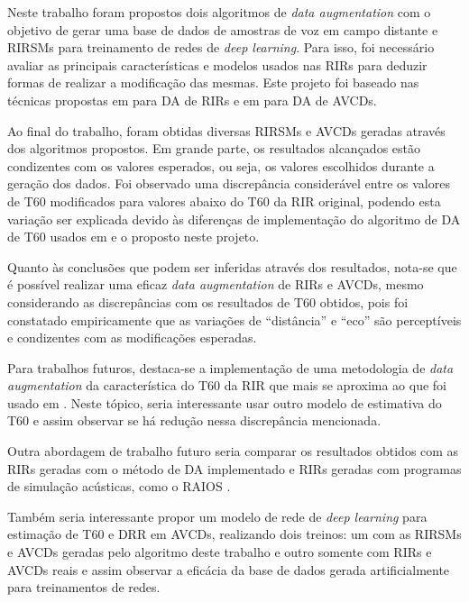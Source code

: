 Neste trabalho foram propostos dois algoritmos de \textit{data augmentation} com o objetivo de gerar uma base de dados de amostras de voz 
em campo distante e RIRSMs para treinamento de redes de \textit{deep learning}.
Para isso, foi necessário avaliar as principais características e modelos usados nas RIRs para deduzir formas de realizar
a modificação das mesmas. Este projeto foi baseado nas técnicas propostas em \cite{RIR_Data_Aug} para DA de RIRs e em \cite{Speech_Rec}
para DA de AVCDs.

Ao final do trabalho, foram obtidas diversas RIRSMs e AVCDs geradas através dos algoritmos propostos. 
Em grande parte, os resultados alcançados estão condizentes com os valores esperados, ou seja, os valores
escolhidos durante a geração dos dados. Foi observado uma discrepância considerável entre os valores de T60 modificados 
para valores abaixo do T60 da RIR original, podendo esta variação ser explicada devido às diferenças de implementação 
do algoritmo de DA de T60 usados em \cite{RIR_Data_Aug} e o proposto neste projeto.

Quanto às conclusões que podem ser inferidas através dos resultados, nota-se que é possível realizar uma eficaz
\textit{data augmentation} de RIRs e AVCDs, mesmo considerando as discrepâncias com os resultados de T60 obtidos,
pois foi constatado empiricamente que as variações de “distância” e “eco” são perceptíveis e condizentes com as modificações
esperadas.

Para trabalhos futuros, destaca-se a implementação de uma metodologia de \textit{data augmentation} da característica do T60
da RIR que mais se aproxima ao que foi usado em \cite{RIR_Data_Aug}. Neste tópico, seria interessante usar outro modelo
de estimativa do T60 e assim observar se há redução nessa discrepância mencionada.

Outra abordagem de trabalho futuro seria comparar os resultados obtidos com as RIRs geradas com o método de DA implementado e RIRs 
geradas com programas de simulação acústicas, como o RAIOS \cite{RAIOS}.

Também seria interessante propor um modelo de rede de \textit{deep learning} para estimação de T60 e DRR em AVCDs,
realizando dois treinos: um com as RIRSMs e AVCDs geradas pelo algoritmo deste trabalho e outro somente com RIRs e AVCDs reais e 
assim observar a eficácia da base de dados gerada artificialmente para treinamentos de redes.







